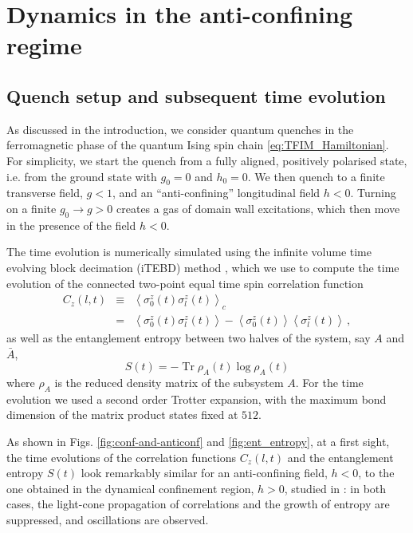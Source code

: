 \documentclass[amsmath,amssymb,11pt]{article}
\numberwithin{equation}{section}
\numberwithin{figure}{section}
\numberwithin{table}{section}
\DeclareMathOperator{\Tr}{Tr}
\begin{document}
\section{Dynamics in the anti-confining regime}\label{sec:dynamics}

\subsection{Quench setup and  subsequent time evolution}

As discussed in the introduction, we consider quantum quenches in the ferromagnetic phase of the quantum Ising spin chain \eqref{eq:TFIM_Hamiltonian}. For simplicity, we  start the quench from 
 a fully aligned, positively polarised state, i.e. from the ground state 
with $g_{0}=0$ and $h_0=0$. We then quench to 
a finite transverse field, $g<1$, and an ``anti-confining''
longitudinal field $h<0$. Turning on a finite $g_0\to g>0$  creates
a gas of domain wall excitations, which then move in the presence of the field 
$h<0$.

The time evolution is numerically simulated
using the infinite volume time evolving block decimation (iTEBD) method
\cite{2004PhRvL..93d0502V}, which we use to compute the time
evolution of the connected  two-point equal time spin correlation function
\begin{eqnarray}
C_z(l,t)&\equiv&\left\langle \sigma_{0}^{z}(t)\sigma_{l}^{z}(t)\right\rangle _{c}\\
&=&
\left\langle \sigma_{0}^{z}(t)\sigma_{l}^{z}(t)\right\rangle-
\left\langle \sigma_{0}^{z}(t)\right\rangle\left\langle\sigma_{l}^{z}(t)\right\rangle
\,,\nonumber    
\end{eqnarray}
as well as the entanglement entropy between two halves of the system, say $A$ and $\bar{A}$,
\begin{equation}
S(t) = -\Tr \rho_A(t) \log \rho_A(t)
\end{equation}
where $\rho_A$ is the reduced density matrix of the subsystem $A$. {For the time evolution we used a second order Trotter expansion, with the maximum bond dimension of the matrix product states fixed at $512$.}

{As shown  in Figs. \ref{fig:conf-and-anticonf} and \ref{fig:ent_entropy}, at a first sight, the time evolutions  of the correlation functions $C_z(l,t)$ and the entanglement entropy $S(t)$ look remarkably similar for an anti-confining field, $h<0$, to the one obtained in the dynamical confinement region, $h>0$, studied in \cite{2017NatPh..13..246K}: in both cases, the light-cone propagation of correlations and the growth of entropy are suppressed, and oscillations are observed.}
\end{document}
